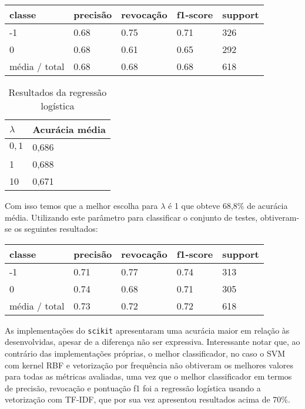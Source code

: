 \begin{table}[H]
	\centering
		\begin{tabular}{l | l | l | l | l}
		\hline
		classe  	&	precisão  &  revocação &  f1-score &  support \\
		\hline
		 -1    &   0.68   &   0.75   &   0.71   &    326 \\
		 \hline
          0    &   0.68   &   0.61   &   0.65   &    292 \\
		\hline
		média / total   &    0.68   &   0.68   &   0.68   &    618 \\
		\hline
	\end{tabular}
\end{table}

\begin{table}[H]
	\centering
	\caption{Resultados da regressão logística}
	\begin{tabular}{l l}
		\hline
		$\lambda$ & Acurácia média \\
		\hline
		$0,1$ & 0,686 \\
		\hline
		1 & 0,688 \\
		\hline
		10 & 0,671 \\
	\end{tabular}
\end{table}


Com isso temos que a melhor escolha para $\lambda$ é 1 que obteve 68,8\% de acurácia média.
Utilizando este parâmetro para classificar o conjunto de testes, obtiveram-se os seguintes resultados:

\begin{table}[H]
	\centering
		\begin{tabular}{l | l | l | l | l}
		\hline
		classe  	&	precisão  &  revocação &  f1-score &  support \\
		\hline
		 -1    &   0.71   &   0.77   &   0.74   &    313 \\
		 \hline
          0    &   0.74   &   0.68   &   0.71   &    305 \\
		\hline
		média / total   &    0.73   &   0.72   &   0.72   &    618 \\
		\hline
	\end{tabular}
\end{table}

As implementações do \texttt{scikit} apresentaram uma acurácia maior em relação às
desenvolvidas, apesar de a diferença não ser expressiva. Interessante notar que,
ao contrário das implementações próprias, o melhor classificador, no caso o SVM
com kernel RBF e vetorização por frequência não obtiveram os melhores valores para
todas as métricas avaliadas, uma vez que o melhor classificador em termos de
precisão, revocação e pontuação f1 foi a regressão logística usando a vetorização
com TF-IDF, que por sua vez apresentou resultados acima de 70\%.

